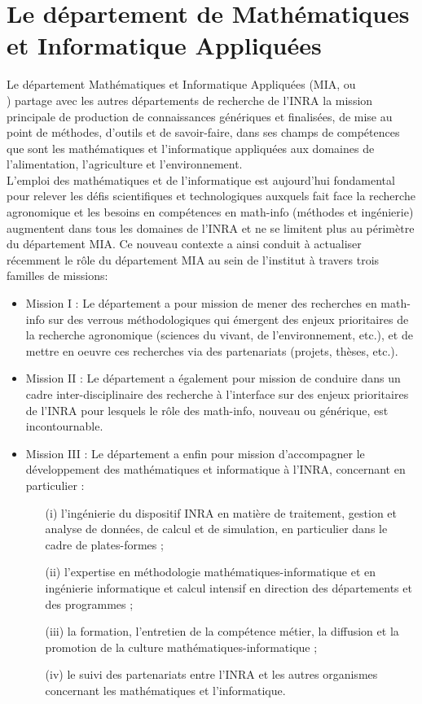 \section{ Le d\'epartement de Math\'ematiques et Informatique Appliqu\'ees}
Le d\'epartement Math\'ematiques et Informatique Appliqu\'ees (MIA,  ou\\   ) partage avec les autres d\'epartements de recherche de l'INRA la mission principale de production de connaissances g\'en\'eriques et finalis\'ees, de mise au point de m\'ethodes, d'outils et de savoir-faire, dans ses champs de comp\'etences que sont les math\'ematiques et l'informatique appliqu\'ees aux domaines de l'alimentation, l'agriculture et l'environnement. \\
L'emploi des math\'ematiques et de l'informatique est aujourd'hui fondamental pour relever les d\'efis scientifiques et technologiques auxquels fait face la recherche agronomique et les besoins en comp\'etences en math-info (m\'ethodes et ing\'enierie) augmentent dans tous les domaines de l'INRA et ne se limitent plus au p\'erim\`etre du d\'epartement MIA. Ce nouveau contexte a ainsi conduit \`a actualiser r\'ecemment le r\^ole du d\'epartement MIA au sein de l'institut \`a travers trois familles de missions:
\begin{itemize}
\item Mission I : Le d\'epartement a pour mission de mener des recherches en math-info sur des verrous m\'ethodologiques qui \'emergent des enjeux prioritaires de la recherche agronomique (sciences du vivant, de l'environnement, etc.), et de mettre en oeuvre ces recherches via des partenariats (projets, th\`eses, etc.).
\item Mission II : Le d\'epartement a \'egalement pour mission de conduire dans un cadre inter-disciplinaire des recherche \`a l'interface sur des enjeux prioritaires de l'INRA pour lesquels le r\^ole des math-info, nouveau ou g\'en\'erique, est incontournable.
\item Mission III : Le d\'epartement a enfin pour mission d'accompagner le d\'eveloppement des math\'ematiques et informatique \`a l'INRA, concernant en particulier : 
\begin{itemize}
\item[(i)] l'ing\'enierie du dispositif INRA en mati\`ere de traitement, gestion et analyse de donn\'ees, de calcul et de simulation, en particulier dans le cadre de plates-formes ;
\item[(ii)] l'expertise en m\'ethodologie math\'ematiques-informatique et en ing\'enierie informatique et calcul intensif en direction des d\'epartements et des programmes ;
\item[(iii)] la formation, l'entretien de la comp\'etence m\'etier, la diffusion et la promotion de la culture math\'e\-matiques-informatique ; 
\item[(iv)] le suivi des partenariats entre l'INRA et les autres organismes concernant les math\'ematiques et l'informatique.
\end{itemize}
\end{itemize}

